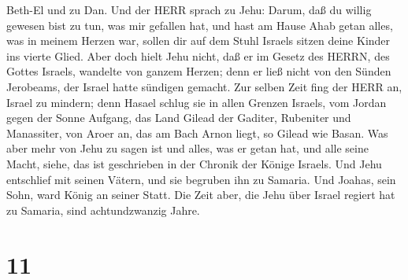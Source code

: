 Beth-El und zu Dan.  Und der HERR sprach zu Jehu: Darum,
daß du willig gewesen bist zu tun, was mir gefallen hat, und hast am
Hause Ahab getan alles, was in meinem Herzen war, sollen dir auf dem
Stuhl Israels sitzen deine Kinder ins vierte Glied.  Aber
doch hielt Jehu nicht, daß er im Gesetz des HERRN, des Gottes Israels,
wandelte von ganzem Herzen; denn er ließ nicht von den Sünden Jerobeams,
der Israel hatte sündigen gemacht.  Zur selben Zeit fing
der HERR an, Israel zu mindern; denn Hasael schlug sie in allen Grenzen
Israels,  vom Jordan gegen der Sonne Aufgang, das Land
Gilead der Gaditer, Rubeniter und Manassiter, von Aroer an, das am Bach
Arnon liegt, so Gilead wie Basan.  Was aber mehr von Jehu
zu sagen ist und alles, was er getan hat, und alle seine Macht, siehe,
das ist geschrieben in der Chronik der Könige Israels.  Und
Jehu entschlief mit seinen Vätern, und sie begruben ihn zu Samaria. Und
Joahas, sein Sohn, ward König an seiner Statt.  Die Zeit
aber, die Jehu über Israel regiert hat zu Samaria, sind achtundzwanzig
Jahre.

\hypertarget{section-10}{%
\section{11}\label{section-10}}

